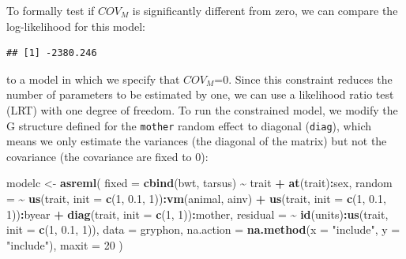 \documentclass[
  12pt,
]{book}
\newenvironment{Shaded}{\begin{snugshade}}{\end{snugshade}}
\newcommand{\DataTypeTok}[1]{\textcolor[rgb]{0.13,0.29,0.53}{#1}}
\newcommand{\DecValTok}[1]{\textcolor[rgb]{0.00,0.00,0.81}{#1}}
\newcommand{\FloatTok}[1]{\textcolor[rgb]{0.00,0.00,0.81}{#1}}
\newcommand{\KeywordTok}[1]{\textcolor[rgb]{0.13,0.29,0.53}{\textbf{#1}}}
\newcommand{\NormalTok}[1]{#1}
\newcommand{\OperatorTok}[1]{\textcolor[rgb]{0.81,0.36,0.00}{\textbf{#1}}}
\newcommand{\StringTok}[1]{\textcolor[rgb]{0.31,0.60,0.02}{#1}}
\begin{document}
To formally test if \(COV_M\) is significantly different from zero, we can compare the log-likelihood for this model:

\begin{Shaded}
\end{Shaded}

\begin{verbatim}
## [1] -2380.246
\end{verbatim}

to a model in which we specify that \(COV_M\)=0. Since this constraint reduces the number of parameters to be estimated by one, we can use a likelihood ratio test (LRT) with one degree of freedom. To run the constrained model, we modify the G structure defined for the \texttt{mother} random effect to diagonal (\texttt{diag}), which means we only estimate the variances (the diagonal of the matrix) but not the covariance (the covariance are fixed to 0):

\begin{Shaded}
\begin{Highlighting}[]
\NormalTok{modelc \textless{}{-}}\StringTok{ }\KeywordTok{asreml}\NormalTok{(}
  \DataTypeTok{fixed =} \KeywordTok{cbind}\NormalTok{(bwt, tarsus) }\OperatorTok{\textasciitilde{}}\StringTok{ }\NormalTok{trait }\OperatorTok{+}\StringTok{ }\KeywordTok{at}\NormalTok{(trait)}\OperatorTok{:}\NormalTok{sex,}
  \DataTypeTok{random =} \OperatorTok{\textasciitilde{}}\StringTok{ }\KeywordTok{us}\NormalTok{(trait, }\DataTypeTok{init =} \KeywordTok{c}\NormalTok{(}\DecValTok{1}\NormalTok{, }\FloatTok{0.1}\NormalTok{, }\DecValTok{1}\NormalTok{))}\OperatorTok{:}\KeywordTok{vm}\NormalTok{(animal, ainv) }\OperatorTok{+}
\StringTok{    }\KeywordTok{us}\NormalTok{(trait, }\DataTypeTok{init =} \KeywordTok{c}\NormalTok{(}\DecValTok{1}\NormalTok{, }\FloatTok{0.1}\NormalTok{, }\DecValTok{1}\NormalTok{))}\OperatorTok{:}\NormalTok{byear }\OperatorTok{+}
\StringTok{    }\KeywordTok{diag}\NormalTok{(trait, }\DataTypeTok{init =} \KeywordTok{c}\NormalTok{(}\DecValTok{1}\NormalTok{, }\DecValTok{1}\NormalTok{))}\OperatorTok{:}\NormalTok{mother,}
  \DataTypeTok{residual =} \OperatorTok{\textasciitilde{}}\StringTok{ }\KeywordTok{id}\NormalTok{(units)}\OperatorTok{:}\KeywordTok{us}\NormalTok{(trait, }\DataTypeTok{init =} \KeywordTok{c}\NormalTok{(}\DecValTok{1}\NormalTok{, }\FloatTok{0.1}\NormalTok{, }\DecValTok{1}\NormalTok{)),}
  \DataTypeTok{data =}\NormalTok{ gryphon,}
  \DataTypeTok{na.action =} \KeywordTok{na.method}\NormalTok{(}\DataTypeTok{x =} \StringTok{"include"}\NormalTok{, }\DataTypeTok{y =} \StringTok{"include"}\NormalTok{),}
  \DataTypeTok{maxit =} \DecValTok{20}
\NormalTok{)}
\end{Highlighting}
\end{Shaded}
\end{document}
